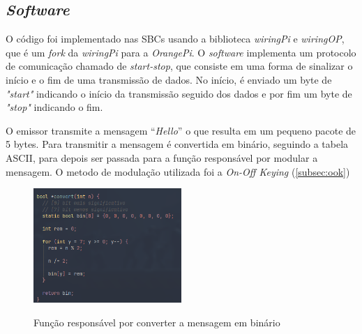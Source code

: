 \subsection{\textit{Software}}

O código foi implementado nas SBCs usando a biblioteca \textit{wiringPi} e \textit{wiringOP}, que é um \textit{fork} da \textit{wiringPi} para a \textit{OrangePi}. O \textit{software} implementa um protocolo de comunicação chamado de \textit{start-stop}, que consiste em uma forma de sinalizar o início e o fim de uma transmissão de dados. No início, é enviado um byte de \textit{"start"} indicando o início da transmissão seguido dos dados e por fim um byte de \textit{"stop"} indicando o fim.

O emissor transmite a mensagem ``\textit{Hello}” o que resulta em um pequeno pacote de 5 bytes. Para transmitir a mensagem é convertida em binário, seguindo a tabela ASCII, para depois ser passada para a função responsável por modular a mensagem. O metodo de modulação utilizada foi a \textit{On-Off Keying} (\autoref{subsec:ook})

\begin{figure}[!htbp]
  \caption{Função responsável por converter a mensagem em binário}
  \includegraphics[width=0.5\textwidth]{images/convert_emissor.png}
  \label{convert_emissor}
\end{figure}


